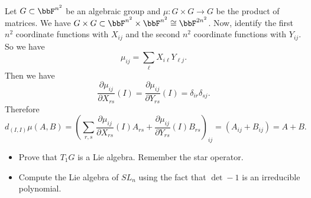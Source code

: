\begin{itemize}
  \begin{example}
    Let $G\subset \bbF^{n^2}$ be an algebraic group and $\mu:G\times G\to G$ be the product of matrices. 
    We have $G\times G\subset \bbF^{n^2}\times\bbF^{n^2}\cong \bbF^{2n^2}$. Now, identify the
    first $n^2$ coordinate functions with $X_{ij}$ and the second $n^2$ coordinate functions with $Y_{ij}$. So we have 
    \begin{equation}
        \mu_{ij} = \sum_\ell X_{i\ell}Y_{\ell j}.
    \end{equation} 
    Then we have 
    \begin{equation}
        \frac{\partial \mu_{ij}}{\partial X_{rs}}(I) = \frac{\partial \mu_{ij}}{\partial Y_{rs}}(I) =\delta_{ir}\delta_{sj}.
    \end{equation}
    Therefore 
    \begin{equation}
        d_{(I,I)}\mu(A,B) = (\sum_{r,s} \frac{\partial \mu_{ij}}{\partial X_{rs}}(I)A_{rs}+
          \frac{\partial \mu_{ij}}{\partial Y_{rs}}(I)B_{rs}  )_{ij} = (A_{ij} + B_{ij}) = A+B.
    \end{equation}
  \end{example}
  \begin{center}
    \TODO 
    \begin{itemize}
        \item[1.] Prove that $T_1G$ is a Lie algebra. Remember the star operator.
        \item[2.]  Compute the Lie algebra of $SL_n$ using the fact that $\det-1$ is an irreducible polynomial.
    \end{itemize}
  \end{center}
\end{itemize}
 

